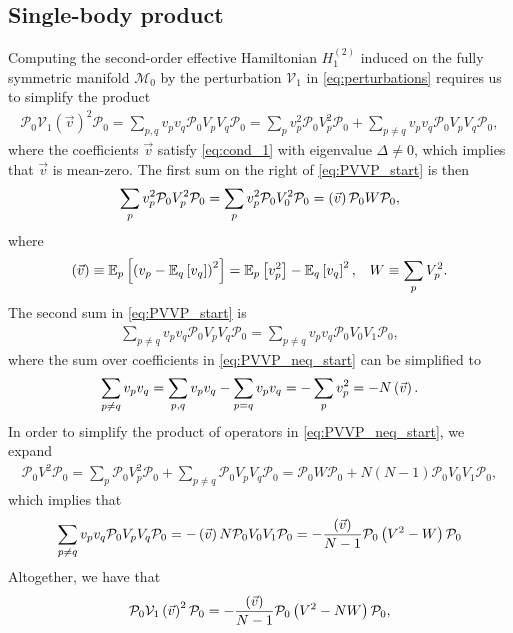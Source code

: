 \documentclass[nofootinbib,notitlepage,11pt]{revtex4-2}
\newcommand{\f}[2]{\dfrac{#1}{#2}} %
\newcommand{\p}[1]{\left(#1\right)} %
\renewcommand{\sp}[1]{\left[#1\right]} %
\renewcommand{\v}{\vec} %
\newcommand{\1}{\mathds{1}}
\newcommand{\M}{\mathcal{M}}
\renewcommand{\P}{\mathcal{P}}
\newcommand{\V}{\mathcal{V}}
\newcommand{\EE}{\mathbb{E}}
\let\var\relax
\DeclareMathOperator{\var}{var}
\begin{document}
\subsection{Single-body product}
\label{sec:PVVP}

Computing the second-order effective Hamiltonian $H_1^{(2)}$ induced
on the fully symmetric manifold $\M_0$ by the perturbation $\V_1$ in
\eqref{eq:perturbations} requires us to simplify the product
\begin{align}
  \P_0 \V_1\p{\v v}^2 \P_0
  = \sum_{p,q} v_p v_q \P_0 V_p V_q \P_0
  = \sum_p v_p^2 \P_0 V_p^2 \P_0
  + \sum_{p\ne q} v_p v_q \P_0 V_p V_q \P_0,
  \label{eq:PVVP_start}
\end{align}
where the coefficients $\v v$ satisfy \eqref{eq:cond_1} with
eigenvalue $\Delta\ne0$, which implies that $\v v$ is mean-zero.  The
first sum on the right of \eqref{eq:PVVP_start} is then
\begin{align}
  \sum_p v_p^2 \P_0 V_p^2 \P_0
  = \sum_p v_p^2 \P_0 V_0^2 \P_0
  = \var\p{\v v} \P_0 W \P_0,
  \label{eq:PVVP_eq}
\end{align}
where
\begin{align}
  \var\p{\v v} \equiv \EE_p\sp{\p{v_p-\EE_q\sp{v_q}}^2}
  = \EE_p\sp{v_p^2} - \EE_q\sp{v_q}^2,
  &&
  W \equiv \sum_p V_p^2.
\end{align}
The second sum in \eqref{eq:PVVP_start} is
\begin{align}
  \sum_{p\ne q} v_p v_q \P_0 V_p V_q \P_0
  = \sum_{p\ne q} v_p v_q \P_0 V_0 V_1 \P_0,
  \label{eq:PVVP_neq_start}
\end{align}
where the sum over coefficients in \eqref{eq:PVVP_neq_start} can be
simplified to
\begin{align}
  \sum_{p\ne q} v_p v_q
  = \sum_{p,q} v_p v_q - \sum_{p=q} v_p v_q
  = - \sum_p v_p^2 = - N \var\p{\v v}.
\end{align}
In order to simplify the product of operators in
\eqref{eq:PVVP_neq_start}, we expand
\begin{align}
  \P_0 V^2 \P_0
  = \sum_p \P_0 V_p^2 \P_0
  + \sum_{p\ne q} \P_0 V_p V_q \P_0
  = \P_0 W \P_0 + N \p{N-1} \P_0 V_0 V_1 \P_0,
  \label{eq:PVVP_neq_ops}
\end{align}
which implies that
\begin{align}
  \sum_{p\ne q} v_p v_q \P_0 V_p V_q \P_0
  = - \var\p{\v v} N \P_0 V_0 V_1 \P_0
  = -\f{\var\p{\v v}}{N-1} \P_0 \p{V^2 - W} \P_0
  \label{eq:PVVP_neq}
\end{align}
Altogether, we have that
\begin{align}
  \P_0 \V_1\p{\v v}^2 \P_0
  = -\f{\var\p{\v v}}{N-1} \P_0 \p{V^2 - N W} \P_0,
\end{align}
\end{document}
